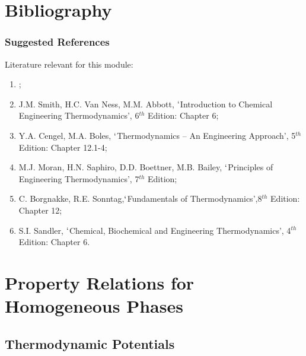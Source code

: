 \documentclass[10pt,compress,handout,unknownkeysallowed]{beamer}
\begin{document}
\section{Bibliography}
\begin{frame}
 \frametitle{Suggested References}
  Literature relevant for this module:
  \begin{enumerate}[1.]
   \item {};
   \item\label{SVN_Book} J.M. Smith, H.C. Van Ness, M.M. Abbott, $\lq$Introduction to Chemical Engineering Thermodynamics', 6$^{th}$ Edition: Chapter 6;
   \item Y.A. Cengel, M.A. Boles, $\lq$Thermodynamics -- An Engineering Approach', 5$^{th}$ Edition: Chapter 12.1-4; 
   \item M.J. Moran, H.N. Saphiro, D.D. Boettner, M.B. Bailey, $\lq$Principles of Engineering Thermodynamics', 7$^{th}$ Edition; 
   \item C. Borgnakke, R.E. Sonntag,$\lq$Fundamentals of Thermodynamics',8$^{th}$ Edition: Chapter 12;
   \item S.I. Sandler, $\lq$Chemical, Biochemical and Engineering Thermodynamics', 4$^{th}$ Edition: Chapter 6.
  \end{enumerate} 
\end{frame}


\section{Property Relations for Homogeneous Phases}

\subsection{Thermodynamic Potentials} 
\end{document}
